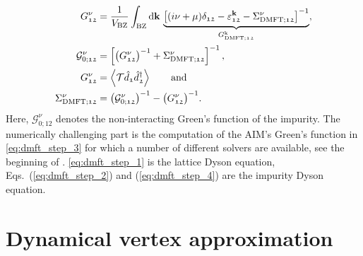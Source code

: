 \documentclass[../../main.tex]{subfiles}
\begin{document}
\begin{subequations}
\begin{align}
	G^{\nu}_{\mathfrak{12}}&=\frac{1}{V_{\text{BZ}}}\int_{\text{BZ}}^{}\text{d}\textbf{k}\,\underbrace{\left [(i\nu+\mu)\delta_{\mathfrak{12}}-\varepsilon^{\textbf{k}}_{\mathfrak{12}}-\Sigma_{\text{DMFT};\mathfrak{12}}^{\nu}\right ]^{-1}}_{G^{\text{k}}_{\text{DMFT};\mathfrak{12}}},\label{eq:dmft_step_1}\\
	\mathcal{G}^{\nu}_{0;\mathfrak{12}}&=\left [\big (G^{\nu}_{\mathfrak{12}}\big )^{-1}+\Sigma_{\text{DMFT};\mathfrak{12}}^{\nu}\right ]^{-1},\label{eq:dmft_step_2}\\
	G^{\nu}_{\mathfrak{12}}&=\left\langle \mathcal{T}\hat d_{\mathfrak{1}}\hat d^{\dagger}_{\mathfrak{2}}\right\rangle\qquad\text{and}\label{eq:dmft_step_3}\\
	\Sigma_{\text{DMFT};\mathfrak{12}}^{\nu}&=\left (\mathcal{G}^{\nu}_{0;\mathfrak{12}}\right )^{-1}-\big (G^{\nu}_{\mathfrak{12}}\big )^{-1}\label{eq:dmft_step_4}.
\end{align}
\end{subequations}
Here, $\mathcal{G}^{\nu}_{0;\mathfrak{12}}$ denotes the non-interacting Green's function of the impurity. The numerically challenging part is the computation of the AIM's Green's function in \eqref{eq:dmft_step_3} for which a number of different solvers are available, see the beginning of . \eqref{eq:dmft_step_1} is the lattice Dyson equation, Eqs.~(\ref{eq:dmft_step_2}) and (\ref{eq:dmft_step_4}) are the impurity Dyson equation.

\section{Dynamical vertex approximation}\label{sec:dga}
\end{document}
